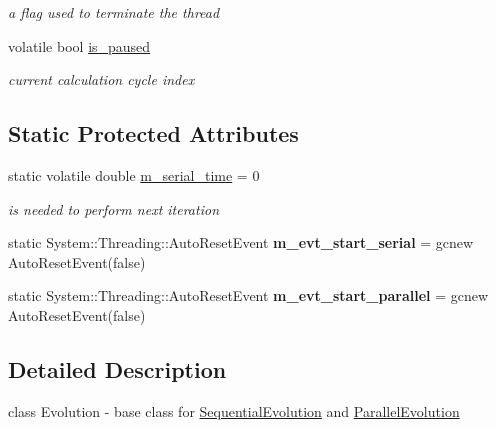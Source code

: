 \begin{DoxyCompactItemize}
\begin{DoxyCompactList}\small\item\em a flag used to terminate the thread \end{DoxyCompactList}\item 
\hypertarget{classabstract_a9a591d53b6c198319e01bffa04009233}{}volatile bool \hyperlink{classabstract_a9a591d53b6c198319e01bffa04009233}{is\+\_\+paused}\label{classabstract_a9a591d53b6c198319e01bffa04009233}

\begin{DoxyCompactList}\small\item\em current calculation cycle index \end{DoxyCompactList}\end{DoxyCompactItemize}
\subsection*{Static Protected Attributes}
\begin{DoxyCompactItemize}
\item 
static volatile double \hyperlink{classabstract_a695c458d4949105d155a6839b1570b0d}{m\+\_\+serial\+\_\+time} = 0
\begin{DoxyCompactList}\small\item\em is needed to perform next iteration \end{DoxyCompactList}\item 
\hypertarget{classabstract_a71e22ed08dac79fd10ef02eaf3c41181}{}static System\+::\+Threading\+::\+Auto\+Reset\+Event {\bfseries m\+\_\+evt\+\_\+start\+\_\+serial} = gcnew Auto\+Reset\+Event(false)\label{classabstract_a71e22ed08dac79fd10ef02eaf3c41181}

\item 
\hypertarget{classabstract_a9e445622a55642f7404d61cb4ec15661}{}static System\+::\+Threading\+::\+Auto\+Reset\+Event {\bfseries m\+\_\+evt\+\_\+start\+\_\+parallel} = gcnew Auto\+Reset\+Event(false)\label{classabstract_a9e445622a55642f7404d61cb4ec15661}

\end{DoxyCompactItemize}


\subsection{Detailed Description}
class Evolution -\/ base class for \hyperlink{classSequentialEvolution}{Sequential\+Evolution} and \hyperlink{classParallelEvolution}{Parallel\+Evolution} 

